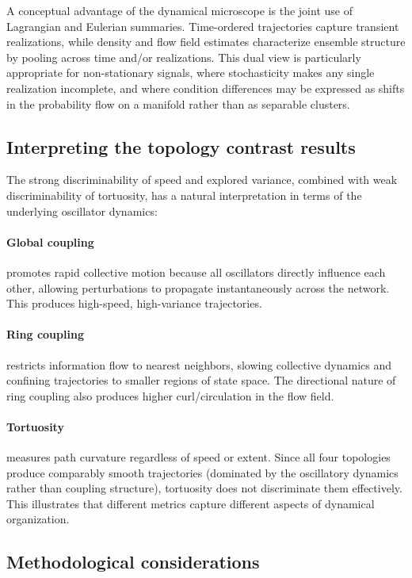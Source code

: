 \documentclass[5p,twocolumn,authoryear]{elsarticle}
\begin{document}
A conceptual advantage of the dynamical microscope is the joint use of Lagrangian and Eulerian summaries. Time-ordered trajectories capture transient realizations, while density and flow field estimates characterize ensemble structure by pooling across time and/or realizations. This dual view is particularly appropriate for non-stationary signals, where stochasticity makes any single realization incomplete, and where condition differences may be expressed as shifts in the probability flow on a manifold rather than as separable clusters.

\subsection{Interpreting the topology contrast results}

The strong discriminability of speed and explored variance, combined with weak discriminability of tortuosity, has a natural interpretation in terms of the underlying oscillator dynamics:

\paragraph{Global coupling} promotes rapid collective motion because all oscillators directly influence each other, allowing perturbations to propagate instantaneously across the network. This produces high-speed, high-variance trajectories.

\paragraph{Ring coupling} restricts information flow to nearest neighbors, slowing collective dynamics and confining trajectories to smaller regions of state space. The directional nature of ring coupling also produces higher curl/circulation in the flow field.

\paragraph{Tortuosity} measures path curvature regardless of speed or extent. Since all four topologies produce comparably smooth trajectories (dominated by the oscillatory dynamics rather than coupling structure), tortuosity does not discriminate them effectively. This illustrates that different metrics capture different aspects of dynamical organization.

\subsection{Methodological considerations}
\end{document}

